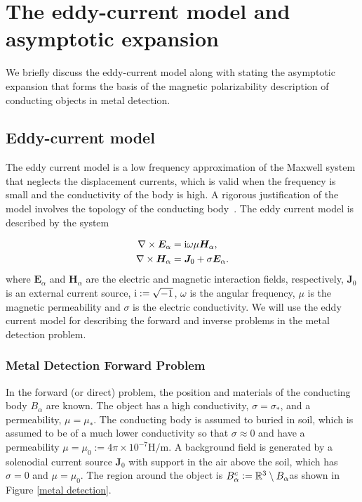
\section{The eddy-current model and asymptotic expansion}\label{sect:eddycurrent}

We briefly discuss the eddy-current model along with stating the asymptotic expansion that forms the basis of the magnetic polarizability description of conducting objects in metal detection.
\subsection{Eddy-current model}
The eddy current model is a low frequency approximation of the Maxwell system that neglects the displacement currents, which is valid when the frequency is small and the conductivity of the body is high. A rigorous justification of the model involves the topology of the conducting body~\cite{ammaribuffa2000}.  The eddy current model is described by the system

\begin{subequations}\label{Eddy Current}
\begin{align}
\nabla\times\bm{E}_{\alpha}&=\mathrm{i} \omega\mu\bm{H}_{\alpha},\\
\nabla\times\bm{H}_{\alpha}&=\bm{J}_0+\sigma\bm{E}_{\alpha}.
\end{align}
\end{subequations}
where $\bm{E}_{\alpha}$ and $\bm{H}_{\alpha}$ are the electric and magnetic interaction fields, respectively, $ \bm{J}_0$ is an external current source, $\mathrm{i}:=\sqrt{-1}$, $\omega$ is the angular frequency, $\mu$ is the magnetic permeability and $\sigma$ is the electric conductivity.  We will use the eddy current model for describing the forward and inverse problems in the metal detection problem.

\subsubsection{Metal Detection Forward Problem} \label{sect:forward}
In the forward (or direct) problem, the position and materials of the conducting body $B_{\alpha}$ are known. The object has a high conductivity, $\sigma=\sigma_*$, and a permeability, $\mu=\mu_*$. The conducting body is assumed to buried in soil, which is assumed to be of a much lower conductivity so that $\sigma\approx0$ and have a permeability $\mu=\mu_0:= 4 \pi \times 10^{-7}\text{H/m}$. A background field is generated by a solenodial current source $\bm{J}_0$ with support in the air above the soil, which has $\sigma=0$ and $\mu =\mu_0$. The region around the object is $B_{\alpha}^c\vcentcolon=\mathbb{R}^3\setminus B_{\alpha}$as shown  in Figure \ref{metal detection}.

